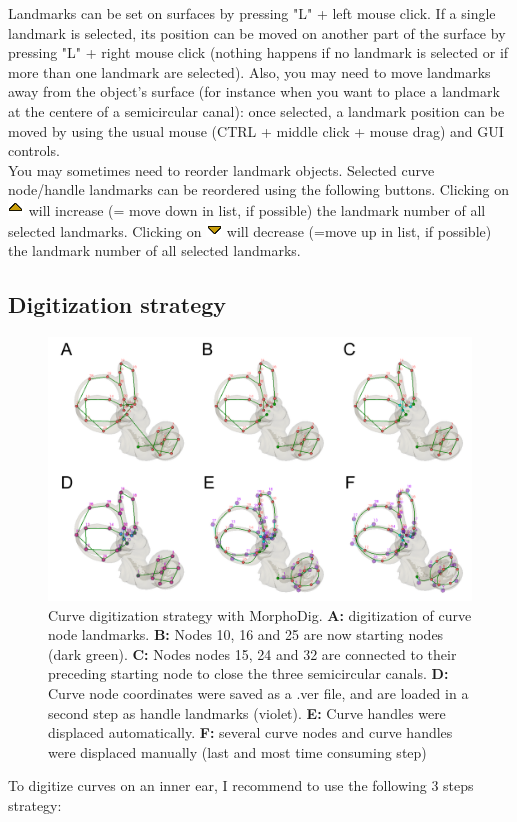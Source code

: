 \documentclass[12pt, a4paper]{book}
\begin{document}
Landmarks can be set on surfaces by pressing "L" + left mouse click. If a single landmark is selected, its position can be moved
on another part of the surface by pressing "L" + right mouse click (nothing happens if no landmark
is selected or if more than one landmark are selected). Also, you may need to move landmarks away
from the object's surface (for instance when you want to place a landmark at the centere of a semicircular canal):
once selected, a landmark position can be moved by using the usual mouse (CTRL + middle click + mouse drag) and GUI controls.\\

You may sometimes need to reorder landmark objects. 
Selected curve node/handle landmarks can be reordered
using the following buttons. Clicking on \includegraphics[scale=0.7]{../images/06/objects/move_up.png} will increase (= move down in list, if possible) the landmark number of all selected landmarks. Clicking on \includegraphics[scale=0.7]{../images/06/objects/move_down.png} will decrease (=move up in list, if possible) the landmark number of all selected landmarks. 

\subsection{Digitization strategy}
\begin{figure}
  \centering
  \includegraphics[scale=0.32]{curve_digitization.png} 
	\caption{Curve digitization strategy with MorphoDig. \textbf{A:} digitization of curve node landmarks. \textbf{B:} Nodes 10, 16 and 25 are now starting nodes (dark green). \textbf{C:} Nodes nodes 15, 24 and 32 are connected to their preceding starting node to close the three semicircular canals. \textbf{D:} Curve node coordinates were saved  as a .ver file, and are loaded in a second step as handle landmarks (violet). \textbf{E:} Curve handles were displaced automatically. \textbf{F:} several curve nodes and curve handles were displaced manually (last and most time consuming step)}
\label{curve_digitization}
 \end{figure}
To digitize curves on an inner ear, I recommend to use the following 3 steps strategy:
\end{document}
